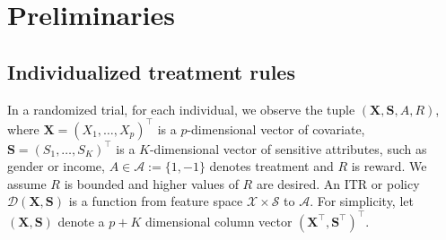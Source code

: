\documentclass[12pt]{article}
\theoremstyle{plain}
\theoremstyle{definition}
\theoremstyle{remark}
\begin{document}

\section{ {Preliminaries}}

\subsection{Individualized treatment rules}
In a randomized trial, for each individual, we observe the tuple $(\boldsymbol{X}, \boldsymbol{S}, A, R)$, where $\boldsymbol{X}=(X_1,  \ldots, X_p)^\top$ is a $p$-dimensional vector of covariate,  $\boldsymbol{S}=(S_1,  \ldots, S_K)^\top$ is a $K$-dimensional vector of sensitive attributes, such as gender or income,  $A \in \mathcal{A}:=\{1,-1\}$ denotes treatment and $R$ is  reward.  We assume $R$ is bounded and higher values of $R$ are desired. An ITR or policy $\mathcal{D}(\boldsymbol{X},\boldsymbol{S})$ is a function from feature space $\mathcal{X}\times\mathcal{S}$ to $\mathcal{A}$. For simplicity, let $(\boldsymbol{X}, \boldsymbol{S})$ denote a $p+K$ dimensional column vector $(\boldsymbol{X}^\top, \boldsymbol{S}^\top)^\top$.
\end{document}
